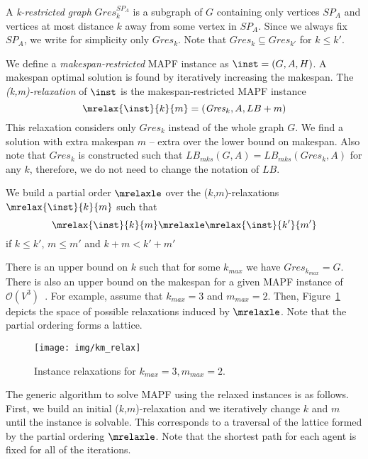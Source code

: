 A \emph{k-restricted graph} $\mathit{Gres}_{k}^{SP_A}$ is a subgraph of $G$ containing only vertices $SP_A$ and vertices at most distance $k$ away from some vertex in $SP_A$. %
Since we always fix $SP_A$, we write for simplicity only $\mathit{Gres}_k$. Note that $\mathit{Gres}_k \subseteq \mathit{Gres}_{k'}$ for $k \leq k'$. %

We define a \emph{makespan-restricted} MAPF instance as $\inst = (G,A,H)$. %
A makespan optimal solution is found by iteratively increasing the makespan.
%
The \emph{(k,m)-relaxation} of $\inst$ is the makespan-restricted MAPF instance
\[
  \mrelax{\inst}{k}{m} = (\mathit{Gres}_k,A,LB+m)
\]
This relaxation considers only $\mathit{Gres}_k$ instead of the whole graph $G$. We find a solution with extra makespan $m$ -- extra over the lower bound on makespan. Also note that $\mathit{Gres}_k$ is constructed such that $LB_{mks}(G,A) = LB_{mks}(\mathit{Gres}_k,A)$ for any $k$, therefore, we do not need to change the notation of $LB$.

We build a partial order $\mrelaxle$ over the ($k$,$m$)-relaxations $\mrelax{\inst}{k}{m}$ such that
\[
\mrelax{\inst}{k}{m} \mrelaxle \mrelax{\inst}{k'}{m'}
\]
if $k \leq k'$, $m\leq m'$ and $k+m < k'+m'$

There is an upper bound on $k$ such that for some $k_{max}$ we have $\mathit{Gres}_{k_{max}} = G$. There is also an upper bound on the makespan for a given MAPF instance of $\mathcal{O}(V^3)$~\cite{pebble_motion}. %
For example, assume that $k_{max}=3$ and $m_{max}=2$. Then, Figure~\ref{fig:example-relax} depicts the space of possible relaxations induced by $\mrelaxle$. Note that the partial ordering forms a lattice.
%
\begin{figure}[h]
  \centering
  \texttt{[image: img/km\_relax]}
  \caption{Instance relaxations for \(k_{max}=3, m_{max}=2\).}
  \label{fig:example-relax}
\end{figure}

The generic algorithm to solve MAPF using the relaxed instances is as follows. First, we build an initial ($k$,$m$)-relaxation and we iteratively change $k$ and $m$ until the instance is solvable. This corresponds to a traversal of the lattice formed by the partial ordering $\mrelaxle$. Note that the shortest path for each agent is fixed for all of the iterations.

